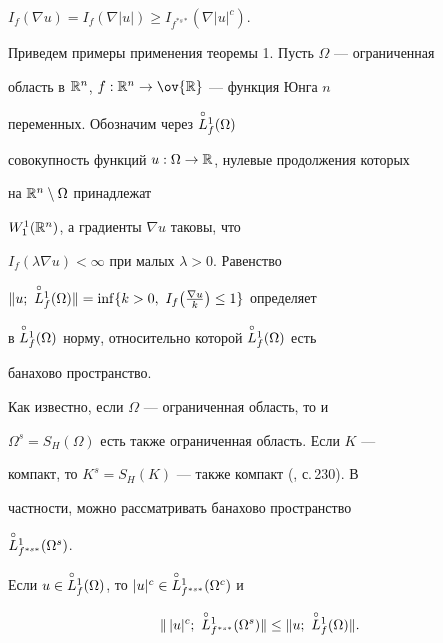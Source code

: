 $I_f(\nabla u)=I_f(\nabla|u|)\ge I_{f^{*s*}}(\nabla|u|^c)$. 


 


Приведем примеры применения теоремы 1. Пусть $\Omega$ --- ограниченная 


область в $\Bbb R^n$, $f:\Bbb R^n\to\ov{\Bbb R}$ --- функция Юнга $n$ 


переменных. Обозначим через $\overset{\circ}{L}{}^1_f(\Omega)$ 


совокупность функций $u:\Omega\to\Bbb R$, нулевые продолжения которых 


на $\Bbb R^n\setminus\Omega$ принадлежат 


$W^1_1(\Bbb R^n)$, а градиенты $\nabla u$ таковы, что 


$I_f(\lambda\nabla u)<\infty$ при малых $\lambda>0$. Равенство 


$\|u;\ \cL^1_f(\Omega)\|=\inf\{k>0,\ I_f\big(\frac{\nabla u}{k}\big)\le 


1\}$ определяет 


в $\overset{\circ}{L}{}^1_f(\Omega)$ норму, относительно которой $\overset{\circ}{L}{}^1_f(\Omega)$ есть 


банахово пространство. 


 


Как известно, если $\Omega$ --- ограниченная область, то и 


$\Omega^s=S_H(\Omega)$ есть также ограниченная область. Если $K$ --- 


компакт, то $K^s=S_H(K)$ --- также компакт (\cite{4}, с.\,230). В 


частности, можно рассматривать банахово пространство 


$\overset{\circ}{L}{}^1_{f^{*s*}}(\Omega^s)$. 


 


\begin{thm} 


Если $u\in\overset{\circ}{L}{}^1_f(\Omega)$, то $|u|^c\in\overset{\circ}{L}{}^1_{f^{*s*}}(\Omega^c)$ и 


\begin{equation} 


\|\,|u|^c;\ \cL^1_{f^{*s*}}(\Omega^s)\|\le\|u; 


\ \cL^1_f(\Omega)\|. 


\end{equation} 


\end{thm} 


